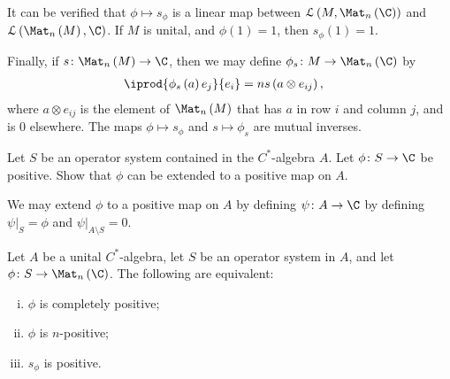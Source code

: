 \documentclass[10pt]{mypackage}
\begin{document}
It can be verified that $\phi\mapsto s_{\phi}$ is a linear map between $\mathcal{L}\left( M,\Mat_n\left( \C \right) \right)$ and $\mathcal{L}\left( \Mat_n\left( M \right),\C \right)$. If $M$ is unital, and $\phi(1) = 1$, then $s_{\phi}(1) = 1$.\newline

Finally, if $s\colon \Mat_n\left( M \right)\rightarrow \C$, then we may define $\phi_s\colon M\rightarrow \Mat_n\left( \C \right)$ by
\begin{align*}
  \iprod{\phi_s\left( a \right)e_j}{e_i} &= ns\left( a\otimes e_{ij} \right),
\end{align*}
where $a\otimes e_{ij}$ is the element of $\Mat_n\left( M \right)$ that has $a$ in row $i$ and column $j$, and is $0$ elsewhere. The maps $\phi\mapsto s_{\phi}$ and $s\mapsto \phi_s$ are mutual inverses.
\begin{exercise}
Let $S$ be an operator system contained in the $C^{\ast}$-algebra $A$. Let $\phi\colon S\rightarrow \C$ be positive. Show that $\phi$ can be extended to a positive map on $A$.
\end{exercise}
\begin{solution}
  We may extend $\phi$ to a positive map on $A$ by defining $\psi\colon A\rightarrow \C$ by defining $\psi|_{S} = \phi$ and $\psi|_{A\setminus S} = 0$.
\end{solution}
\begin{theorem}
  Let $A$ be a unital $C^{\ast}$-algebra, let $S$ be an operator system in $A$, and let $\phi\colon S\rightarrow \Mat_n\left( \C \right)$. The following are equivalent:
  \begin{enumerate}[(i)]
    \item $\phi$ is completely positive;
    \item $\phi$ is $n$-positive;
    \item $s_{\phi}$ is positive.
  \end{enumerate}
\end{theorem}
\end{document}
